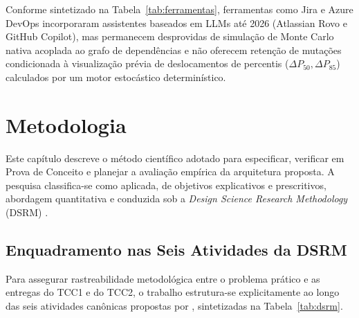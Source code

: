 \documentclass[12pt,openany,oneside,a4paper,english,brazilian,sumario=tradicional]{abntex2}
\begin{document}
Conforme sintetizado na Tabela~\ref{tab:ferramentas}, ferramentas como Jira e Azure DevOps incorporaram assistentes baseados em LLMs até 2026 (Atlassian Rovo e GitHub Copilot), mas permanecem desprovidas de simulação de Monte Carlo nativa acoplada ao grafo de dependências e não oferecem retenção de mutações condicionada à visualização prévia de deslocamentos de percentis ($\Delta P_{50}, \Delta P_{85}$) calculados por um motor estocástico determinístico.

\chapter{Metodologia}\label{cap:metodologia}

Este capítulo descreve o método científico adotado para especificar, verificar em Prova de Conceito e planejar a avaliação empírica da arquitetura proposta. A pesquisa classifica-se como aplicada, de objetivos explicativos e prescritivos, abordagem quantitativa e conduzida sob a \textit{Design Science Research Methodology} (DSRM) \cite{peffers2007}.

\section{Enquadramento nas Seis Atividades da DSRM}\label{sec:dsrm}

Para assegurar rastreabilidade metodológica entre o problema prático e as entregas do TCC1 e do TCC2, o trabalho estrutura-se explicitamente ao longo das seis atividades canônicas propostas por , sintetizadas na Tabela~\ref{tab:dsrm}.
\end{document}
